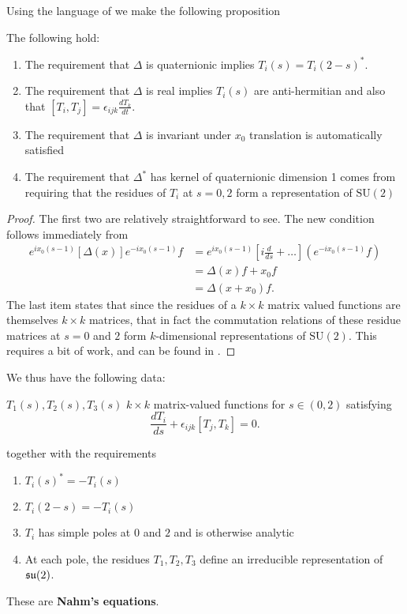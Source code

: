 	Using the language of \cite{hitchin1983} we make the following proposition
	\begin{prop}
		The following hold:
		\begin{enumerate}
			\item The requirement that $\Delta$ is quaternionic implies $T_i(s) = T_i(2-s)^*$.
			\item The requirement that $\Delta$ is real implies $T_i(s)$ are anti-hermitian and also that $[T_i, T_j] = \epsilon_{ijk} \frac{dT_k}{dt}$.
			\item The requirement that $\Delta$ is invariant under $x_0$ translation is automatically satisfied
			\item The requirement that $\Delta^*$ has kernel of quaternionic dimension 1 comes from requiring that the residues of $T_i$ at $s=0, 2$ form a representation of $\mathrm{SU}(2)$
		\end{enumerate}
	\end{prop}
	\begin{proof}
		The first two are relatively straightforward to see. The new condition follows immediately from
		\begin{equation}
			\begin{aligned}
			e^{i x_0 (s-1)} [\Delta(x)] e^{-i x_0 (s-1)} f &= e^{i x_0 (s-1)} \left[i \frac{d}{ds} + \dots \right](e^{-i x_0 (s-1)} f) \\
			&=   \Delta(x)f + x_0 f \\
			&=  \Delta(x+x_0)f.
			\end{aligned}
		\end{equation}
		The last item states that since the residues of a $k \times k$ matrix valued functions are themselves $k \times k$ matrices, that in fact the commutation relations of these residue matrices at $s=0$ and $2$ form $k$-dimensional representations of $\mathrm{SU}(2)$. This requires a bit of work, and can be found in \cite{hitchin1983}.
	\end{proof}
	We thus have the following data:
	\begin{center}
		$T_1(s), T_2(s), T_3(s)$ $k\times k$ matrix-valued functions for $s \in (0, 2)$ satisfying
	\begin{equation}
		\frac{dT_i}{ds} + \epsilon_{ijk} [T_j, T_k] = 0.
	\end{equation}
	\end{center}
	together with the requirements
	\begin{enumerate}
		\setlength\itemsep{0in}
		\item $T_i(s)^{*} = - T_i(s)$
		\item $T_i(2-s) = - T_i(s)$
		\item $T_i$ has simple poles at $0$ and $2$ and is otherwise analytic
		\item At each pole, the residues $T_1, T_2, T_3$ define an irreducible representation of $\frak{su}(2)$.
	\end{enumerate}
	These are \textbf{Nahm's equations}. 
	
